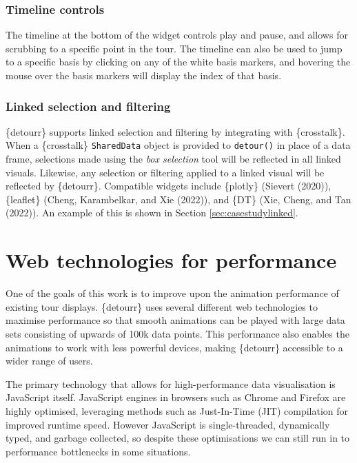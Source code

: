 \hypertarget{timeline-controls}{%
\subsubsection{Timeline controls}\label{timeline-controls}}

The timeline at the bottom of the widget controls play and pause, and allows for scrubbing to a specific point in the tour. The timeline can also be used to jump to a specific basis by clicking on any of the white basis markers, and hovering the mouse over the basis markers will display the index of that basis.

\hypertarget{linked-selection-and-filtering}{%
\subsubsection{Linked selection and filtering}\label{linked-selection-and-filtering}}

\{detourr\} supports linked selection and filtering by integrating with \{crosstalk\}. When a \{crosstalk\} \texttt{SharedData} object is provided to \texttt{detour()} in place of a data frame, selections made using the \emph{box selection} tool will be reflected in all linked visuals. Likewise, any selection or filtering applied to a linked visual will be reflected by \{detourr\}. Compatible widgets include \{plotly\} (Sievert (2020)), \{leaflet\} (Cheng, Karambelkar, and Xie (2022)), and \{DT\} (Xie, Cheng, and Tan (2022)). An example of this is shown in Section \ref{sec:casestudylinked}.

\hypertarget{web-technologies-for-performance}{%
\section{Web technologies for performance}\label{web-technologies-for-performance}}

One of the goals of this work is to improve upon the animation performance of existing tour displays. \{detourr\} uses several different web technologies to maximise performance so that smooth animations can be played with large data sets consisting of upwards of 100k data points. This performance also enables the animations to work with less powerful devices, making \{detourr\} accessible to a wider range of users.

The primary technology that allows for high-performance data visualisation is JavaScript itself. JavaScript engines in browsers such as Chrome and Firefox are highly optimised, leveraging methods such as Just-In-Time (JIT) compilation for improved runtime speed. However JavaScript is single-threaded, dynamically typed, and garbage collected, so despite these optimisations we can still run in to performance bottlenecks in some situations.

